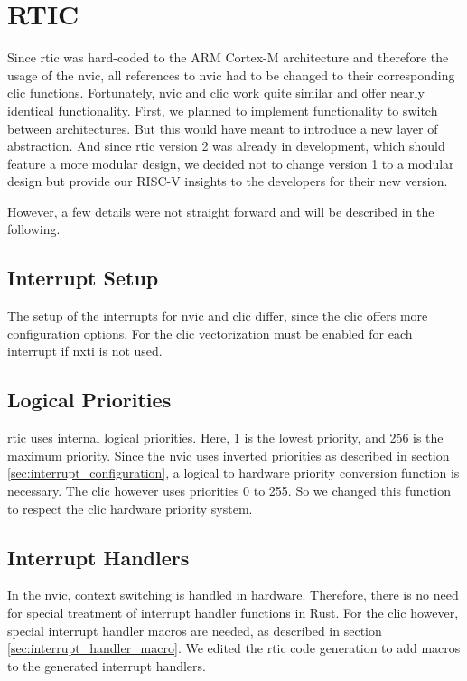 \section{RTIC}
Since \gls{rtic} was hard-coded to the ARM Cortex-M architecture and therefore the usage of the \gls{nvic}, all references to \gls{nvic} had to be changed to their corresponding \gls{clic} functions. Fortunately, \gls{nvic} and \gls{clic} work quite similar and offer nearly identical functionality. First, we planned to implement functionality to switch between architectures. But this would have meant to introduce a new layer of abstraction. And since \gls{rtic} version 2 was already in development, which should feature a more modular design, we decided not to change version 1 to a modular design but provide our RISC-V insights to the developers for their new version.

However, a few details were not straight forward and will be described in the following.

\subsection{Interrupt Setup}
The setup of the interrupts for \gls{nvic} and \gls{clic} differ, since the \gls{clic} offers more configuration options. For the \gls{clic} vectorization must be enabled for each interrupt if nxti is not used. 

\subsection{Logical Priorities}
\gls{rtic} uses internal logical priorities. Here, 1 is the lowest priority, and 256 is the maximum priority. Since the \gls{nvic} uses inverted priorities as described in section \ref{sec:interrupt_configuration}, a logical to hardware priority conversion function is necessary. The \gls{clic} however uses priorities 0 to 255. So we changed this function to respect the \gls{clic} hardware priority system.

\subsection{Interrupt Handlers}
In the \gls{nvic}, context switching is handled in hardware. Therefore, there is no need for special treatment of interrupt handler functions in Rust. For the \gls{clic} however, special interrupt handler macros are needed, as described in section \ref{sec:interrupt_handler_macro}. We edited the \gls{rtic} code generation to add macros to the generated interrupt handlers.

